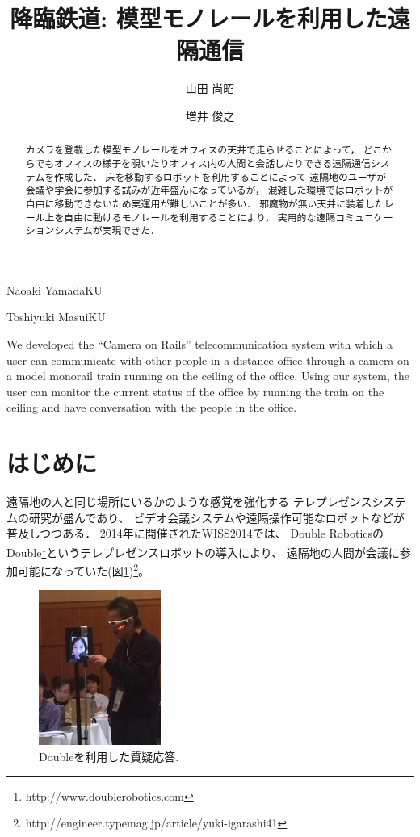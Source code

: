 \documentclass[submit,techreq]{ipsj}
\begin{document}
\title{降臨鉄道: 模型モノレールを利用した遠隔通信}


\author{山田 尚昭}{Naoaki Yamada}{KU}
\author{増井 俊之}{Toshiyuki Masui}{KU}

\begin{abstract}
カメラを登載した模型モノレールをオフィスの天井で走らせることによって，
どこからでもオフィスの様子を覗いたりオフィス内の人間と会話したりできる遠隔通信システムを作成した．
床を移動するロボットを利用することによって
遠隔地のユーザが会議や学会に参加する試みが近年盛んになっているが，
混雑した環境ではロボットが自由に移動できないため実運用が難しいことが多い．
邪魔物が無い天井に装着したレール上を自由に動けるモノレールを利用することにより，
実用的な遠隔コミュニケーションシステムが実現できた．
\end{abstract}

\begin{eabstract}
We developed the ``Camera on Rails'' telecommunication system with
which a user can communicate with other people in a
distance office through a camera on a model monorail train running on the ceiling
of the office. Using our system, the user can monitor the current status
of the office by running the train on the ceiling and have
conversation with the people in the office.
\end{eabstract}

\maketitle

\section{はじめに}

遠隔地の人と同じ場所にいるかのような感覚を強化する
テレプレゼンスシステムの研究が盛んであり、
ビデオ会議システムや遠隔操作可能なロボットなどが普及しつつある．
%
2014年に開催されたWISS2014では、
Double RoboticsのDouble\footnote{
  \textsf{http://www.doublerobotics.com}
}というテレプレゼンスロボットの導入により、
遠隔地の人間が会議に参加可能になっていた(図\ref{double})\footnote{
  \textsf{http://engineer.typemag.jp/article/yuki-igarashi41}
}。

\begin{figure}[t]
\centerline{\includegraphics[width=40mm]{figures/b74f4564d4b38d12e48fcf80fef96def.png}}
\caption{Doubleを利用した質疑応答.}
\label{double}
\end{figure}
\end{document}
